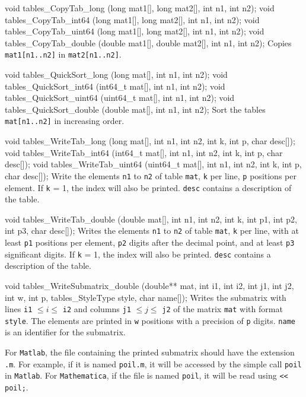 void tables_CopyTab_long (long mat1[], long mat2[], int n1, int n2);
void tables_CopyTab_int64 (long mat1[], long mat2[], int n1, int n2);
void tables_CopyTab_uint64 (long mat1[], long mat2[], int n1, int n2);
void tables_CopyTab_double (double mat1[], double mat2[], int n1, int n2);
\endcode
  \tab Copies {\tt mat1[n1..n2]} in {\tt mat2[n1..n2]}.
  \endtab
\code

void tables_QuickSort_long (long mat[], int n1, int n2);
void tables_QuickSort_int64 (int64_t mat[], int n1, int n2);
void tables_QuickSort_uint64 (uint64_t mat[], int n1, int n2);
void tables_QuickSort_double (double mat[], int n1, int n2);
\endcode
 \tab Sort the tables {\tt mat[n1..n2]} in increasing order.
 \endtab
\code

void tables_WriteTab_long (long mat[], int n1, int n2, int k, int p, 
                           char desc[]);
void tables_WriteTab_int64 (int64_t mat[], int n1, int n2, int k, int p, 
                            char desc[]);
void tables_WriteTab_uint64 (uint64_t mat[], int n1, int n2, int k, int p, 
                             char desc[]);
\endcode
 \tab  Write the elements {\tt n1} to {\tt n2} of table {\tt mat},
  {\tt k} per line, {\tt p} positions per element.
  If  {\tt k} = 1, the index will also be printed. {\tt desc}
  contains a description of the table.
 \endtab
\code

void tables_WriteTab_double (double mat[], int n1, int n2, int k, 
                             int p1, int p2, int p3, char desc[]);
\endcode
 \tab  Writes the elements {\tt n1} to {\tt n2} of table {\tt mat},
  {\tt k} per line, with at least {\tt p1} positions per element,
  {\tt p2} digits after the decimal point, and at least  {\tt p3} significant digits.
   If {\tt k} = 1, the index
  will also be printed. {\tt desc} contains a description of the table.
 \endtab\code

void tables_WriteSubmatrix_double (double** mat, int i1, int i2, int j1, int j2,
                             int w, int p, tables_StyleType style, char name[]);
\endcode
 \tab Writes the submatrix with lines 
   {\tt i1} $\le i \le $ {\tt i2} and columns 
   {\tt j1} $\le j \le $ {\tt j2} of the matrix {\tt mat} with format
   {\tt style}. The elements are printed in {\tt w}
   positions with a precision of {\tt p} digits. {\tt name} is
   an identifier for the submatrix.
  
   For {\tt Matlab}, the file containing the printed submatrix should have 
	 the extension {\tt .m}.
   For example, if it is named {\tt poil.m}, it will be accessed by the
   simple call {\tt poil} in {\tt Matlab}.
   For {\tt Mathematica}, if the file is named {\tt poil},
   it will be read using {\tt << poil;}.
 \endtab
\code

